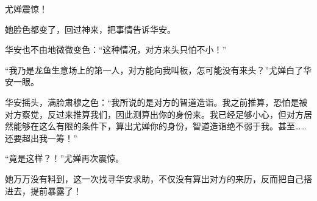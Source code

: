 \begin{this_body}
尤婵震惊！

她脸色都变了，回过神来，把事情告诉华安。

华安也不由地微微变色：“这种情况，对方来头只怕不小！”

“我乃是龙鱼生意场上的第一人，对方能向我叫板，怎可能没有来头？”尤婵白了华安一眼。

华安摇头，满脸肃穆之色：“我所说的是对方的智道造诣。我之前推算，恐怕是被对方察觉，反过来推算我们，因此测算出你的身份来。我已经足够小心，但对方居然能够在这么有限的条件下，算出尤婵你的身份，智道造诣绝不弱于我。甚至……还要超出我一筹！”

“竟是这样？！”尤婵再次震惊。

她万万没有料到，这一次找寻华安求助，不仅没有算出对方的来历，反而把自己搭进去，提前暴露了！

\end{this_body}

